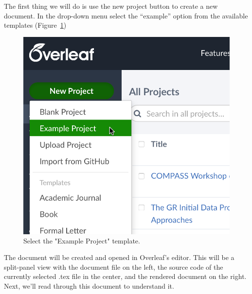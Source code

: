 \documentclass{article}
\begin{document}
The first thing we will do is use the new project button to create a new document. In the drop-down menu select the ``example'' option from the available templates (Figure~\ref{fig:select_example})
\begin{figure}
\centering
\includegraphics[width=0.5\linewidth]{select_example_project.png}
\caption{\label{fig:select_example}Select the "Example Project" template.}
\end{figure}

The document will be created and opened in Overleaf's editor. This will be a split-panel view with the document file on the left, the source code of the currently selected .tex file in the center, and the rendered document on the right.
Next, we'll read through this document to understand it.
\end{document}
